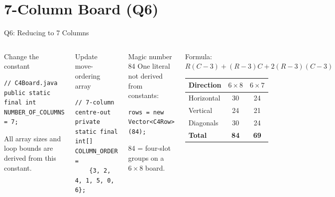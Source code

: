 \documentclass[aspectratio=1610]{beamer}
\begin{document}
\section{7-Column Board (Q6)}

\begin{frame}[fragile]{Q6: Reducing to 7 Columns}
  \begin{columns}[T]
      \begin{block}{Change the constant}
        \begin{lstlisting}
// C4Board.java
public static final int NUMBER_OF_COLUMNS = 7;
        \end{lstlisting}
        All array sizes and loop bounds are derived from this constant.
      \end{block}
      \begin{block}{Update move-ordering array}
        \begin{lstlisting}
// 7-column centre-out
private static final int[] COLUMN_ORDER =
    {3, 2, 4, 1, 5, 0, 6};
        \end{lstlisting}
      \end{block}
      \begin{alertblock}{Magic number 84}
        One literal not derived from constants:
        \begin{lstlisting}
rows = new Vector<C4Row>(84);
        \end{lstlisting}
        84 = four-slot groups on a $6\times8$ board.
      \end{alertblock}
      \begin{exampleblock}{Formula: $R(C{-}3)+(R{-}3)C+2(R{-}3)(C{-}3)$}
        \scriptsize\centering
        \begin{tabular}{lcc}
          \toprule
          Direction & $6{\times}8$ & $6{\times}7$ \\
          \midrule
          Horizontal  & 30 & 24 \\
          Vertical    & 24 & 21 \\
          Diagonals   & 30 & 24 \\
          \midrule
          \textbf{Total} & \textbf{84} & \textbf{69} \\
          \bottomrule
        \end{tabular}
      \end{exampleblock}
  \end{columns}
\end{frame}
\end{document}
